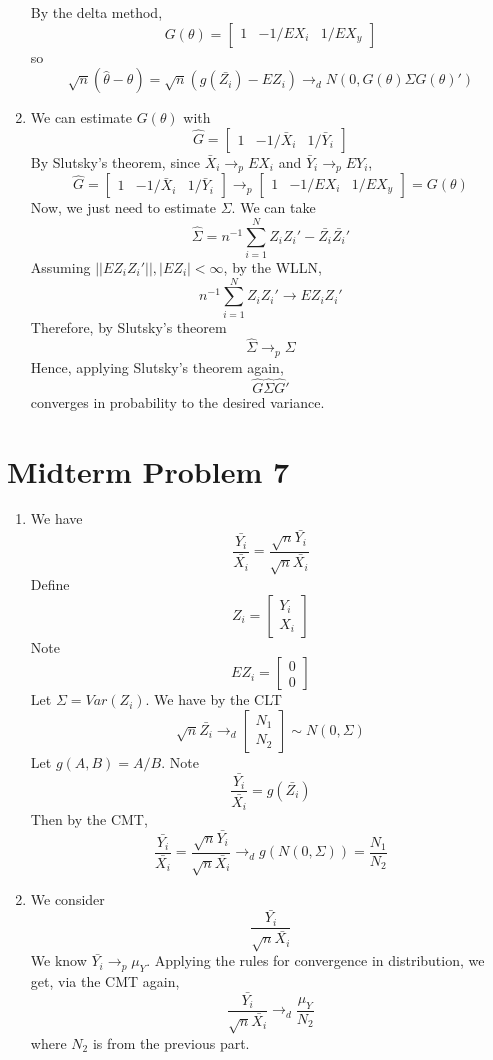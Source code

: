 \documentclass[10pt,letter]{article}
\begin{document}
\begin{enumerate}[label=(\alph*)]
By the delta method,
\[ G(\theta)= \begin{bmatrix} 1 & -1/EX_i & 1/EX_y \end{bmatrix} \]
so
\[ \sqrt{n} (\hat{\theta} - \theta) = \sqrt{n}(g(\bar{Z_i}) - EZ_i) \to_d N(0, G(\theta)\Sigma G(\theta)') \]
\item We can estimate $G(\theta)$ with
\[ \hat{G} = \begin{bmatrix} 1 & -1/\bar{X}_i & 1/\bar{Y}_i \end{bmatrix} \]
By Slutsky's theorem, since $\bar{X}_i \to_p EX_i$ and $\bar{Y}_i \to_p EY_i$,
\[ \hat{G} = \begin{bmatrix} 1 & -1/\bar{X}_i & 1/\bar{Y}_i \end{bmatrix} \to_p  \begin{bmatrix} 1 & -1/EX_i & 1/EX_y \end{bmatrix} =G(\theta) \]
Now, we just need to estimate $\Sigma$. We can take
\[ \hat{\Sigma} = n^{-1} \sum_{i=1}^N Z_iZ_i' - \bar{Z_i}\bar{Z_i}' \]
Assuming $||EZ_iZ_i'||, |EZ_i| < \infty$, by the WLLN,
\[ n^{-1} \sum_{i=1}^N Z_iZ_i' \to EZ_iZ_i' \]
Therefore, by Slutsky's theorem
\[ \hat{\Sigma} \to_p  \Sigma \]
Hence, applying Slutsky's theorem again,
\[ \hat{G} \hat{\Sigma}  \hat{G}'\]
converges in probability to the desired variance.
\end{enumerate}
\section*{Midterm Problem 7}
\begin{enumerate}[label=(\alph*)]
\item We have
\[ \frac{\bar{Y_i}}{\bar{X_i}} = \frac{\sqrt{n}\bar{Y_i}}{\sqrt{n}\bar{X_i}}\]
Define
\[ Z_i = \begin{bmatrix} Y_i \\ X_i \end{bmatrix} \]
Note
\[ EZ_i = \begin{bmatrix} 0 \\ 0 \end{bmatrix} \]
Let $\Sigma = Var(Z_i)$. We have by the CLT
\[ \sqrt{n} \bar{Z_i}  \to_d \begin{bmatrix} N_1 \\ N_2 \end{bmatrix} \sim N(0, \Sigma)  \]
Let $g(A, B) = A/B$. Note
\[ \frac{\bar{Y_i}}{\bar{X_i}} = g(\bar{Z_i}) \]
Then by the CMT,
\[ \frac{\bar{Y_i}}{\bar{X_i}} = \frac{\sqrt{n}\bar{Y_i}}{\sqrt{n}\bar{X_i}} \to_d g(N(0, \Sigma)) = \frac{N_1}{N_2} \]
\item We consider
\[ \frac{\bar{Y_i}}{\sqrt{n}\bar{X_i}} \]
We know $\bar{Y_i} \to_p \mu_Y$. Applying the rules for convergence in distribution, we get, via the CMT again,
\[ \frac{\bar{Y_i}}{\sqrt{n}\bar{X_i}} \to_d \frac{\mu_Y}{N_2}\]
where $N_2$ is from the previous part.

\end{enumerate}
\end{document}

